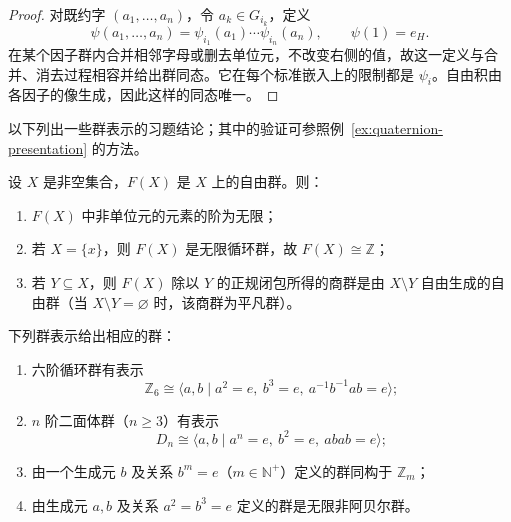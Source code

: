 \begin{proof}
对既约字 $(a_1,\ldots,a_n)$，令 $a_k\in G_{i_k}$，定义
\[
  \psi(a_1,\ldots,a_n)=\psi_{i_1}(a_1)\cdots\psi_{i_n}(a_n),
  \qquad \psi(1)=e_H.
\]
在某个因子群内合并相邻字母或删去单位元，不改变右侧的值，故这一定义与合并、消去过程相容并给出群同态。它在每个标准嵌入上的限制都是 $\psi_i$。自由积由各因子的像生成，因此这样的同态唯一。
\end{proof}

\begin{purplenote}
以下列出一些群表示的习题结论；其中的验证可参照例~\ref{ex:quaternion-presentation} 的方法。
\end{purplenote}

\begin{proposition}\label{prop:free-group-basic-facts}
设 $X$ 是非空集合，$F(X)$ 是 $X$ 上的自由群。则：
\begin{enumerate}[label=(\arabic*)]
  \item $F(X)$ 中非单位元的元素的阶为无限；
  \item 若 $X=\{x\}$，则 $F(X)$ 是无限循环群，故 $F(X)\cong\mathbb Z$；
  \item 若 $Y\subseteq X$，则 $F(X)$ 除以 $Y$ 的正规闭包所得的商群是由 $X\setminus Y$ 自由生成的自由群（当 $X\setminus Y=\varnothing$ 时，该商群为平凡群）。
\end{enumerate}
\end{proposition}

\begin{proposition}\label{prop:group-presentations-examples}
下列群表示给出相应的群：
\begin{enumerate}[label=(\arabic*)]
  \item 六阶循环群有表示
  \[
    \mathbb Z_6\cong\langle a,b\mid a^2=e,\ b^3=e,\ a^{-1}b^{-1}ab=e\rangle;
  \]
  \item $n$ 阶二面体群（$n\geq3$）有表示
  \[
    D_n\cong\langle a,b\mid a^n=e,\ b^2=e,\ abab=e\rangle;
  \]
  \item 由一个生成元 $b$ 及关系 $b^m=e$（$m\in\mathbb N^+$）定义的群同构于 $\mathbb Z_m$；
  \item 由生成元 $a,b$ 及关系 $a^2=b^3
  =e$ 定义的群是无限非阿贝尔群。
\end{enumerate}
\end{proposition}

